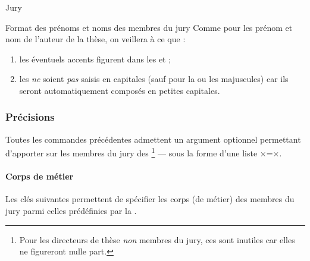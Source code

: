 \begin{dbexample}{Jury}{}
\begin{bodycode}
%
%
%
\end{bodycode}
\end{dbexample}

\begin{dbwarning}{Format des prénoms et noms des membres du jury}{}
  Comme pour les prénom et nom de l'auteur de la thèse, on veillera à ce que :
  \begin{enumerate}
  \item les éventuels accents figurent dans les  et ;
  \item les  \emph{ne} soient \emph{pas} saisis en capitales (sauf
    pour la ou les majuscules) car ils seront automatiquement composés en
    petites capitales.
  \end{enumerate}
\end{dbwarning}

\subsubsection{Précisions}\label{sec:options-staff}

Toutes les commandes précédentes admettent un argument optionnel permettant
d'apporter sur les membres du jury des \footnote{Pour les
  directeurs de thèse \emph{non} membres du jury, ces  sont
  inutiles car elles ne figureront nulle part.} --- sous la forme d'une liste
×=×.

\paragraph{Corps de métier}
\label{sec:corps}

Les clés suivantes\syntaxeoptions{} permettent de spécifier les corps (de
métier) des membres du jury parmi celles prédéfinies par la \yatcl{}.

